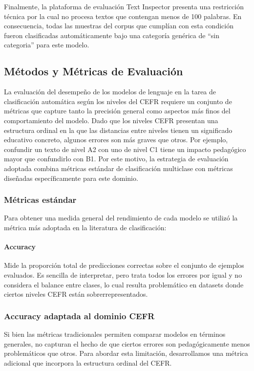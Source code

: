 Finalmente, la plataforma de evaluación Text Inspector presenta una restricción técnica por la cual no procesa textos que contengan menos de 100 palabras. En consecuencia, todas las muestras del corpus que cumplían con esta condición fueron clasificadas automáticamente bajo una categoría genérica de ``sin categoria'' para este modelo.

\subsection{Métodos y Métricas de Evaluación}\label{subsection:clas_metrica}
La evaluación del desempeño de los modelos de lenguaje en la tarea de clasificación automática según los niveles del CEFR requiere un conjunto de métricas que capture tanto la precisión general como aspectos más finos del comportamiento del modelo. Dado que los niveles CEFR presentan una estructura ordinal en la que las distancias entre niveles tienen un significado educativo concreto, algunos errores son más graves que otros. Por ejemplo, confundir un texto de nivel A2 con uno de nivel C1 tiene un impacto pedagógico mayor que confundirlo con B1. Por este motivo, la estrategia de evaluación adoptada combina métricas estándar de clasificación multiclase con métricas diseñadas específicamente para este dominio.

\subsubsection*{Métricas estándar}
Para obtener una medida general del rendimiento de cada modelo se utilizó la métrica más adoptada en la literatura de clasificación:

\paragraph{Accuracy}
Mide la proporción total de predicciones correctas sobre el conjunto de ejemplos evaluados. Es sencilla de interpretar, pero trata todos los errores por igual y no considera el balance entre clases, lo cual resulta problemático en datasets donde ciertos niveles CEFR están sobrerrepresentados.

\subsubsection*{Accuracy adaptada al dominio CEFR}
Si bien las métricas tradicionales permiten comparar modelos en términos generales, no capturan el hecho de que ciertos errores son pedagógicamente menos problemáticos que otros. Para abordar esta limitación, desarrollamos una métrica adicional que incorpora la estructura ordinal del CEFR.

